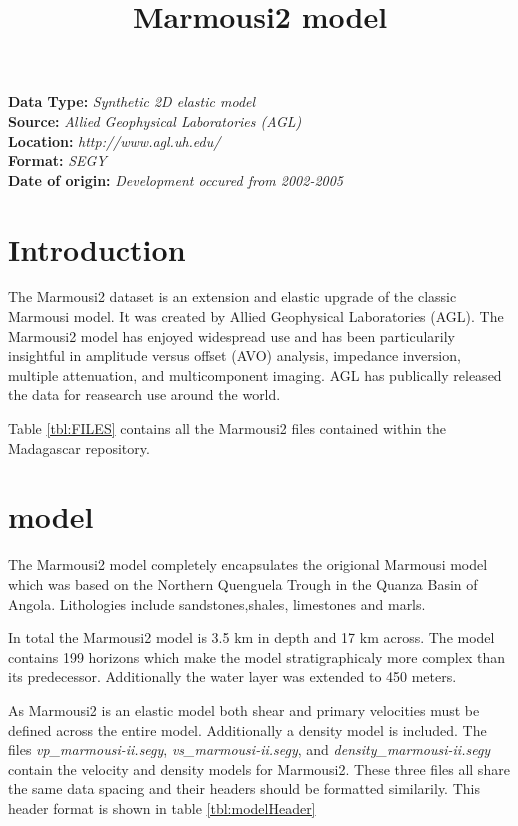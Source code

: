 \title{Marmousi2 model}
\author{}
\lstset{language=python,numbers=left,numberstyle=\tiny,showstringspaces=false}

\maketitle
\noindent
\textbf {Data Type:} \emph{Synthetic 2D elastic model}\\
\textbf {Source:} \emph{Allied Geophysical Laboratories (AGL)}\\
\textbf {Location:} \emph{http://www.agl.uh.edu/}\\
\textbf {Format:} \emph{SEGY} \\
\textbf{Date of origin:} \emph{Development occured from 2002-2005}\\

\section{Introduction}
The Marmousi2 dataset is an extension and elastic upgrade of the classic Marmousi model. It was created by Allied Geophysical 
Laboratories (AGL).  The Marmousi2 model has enjoyed widespread use and has been particularily insightful in amplitude versus
offset (AVO) analysis, impedance inversion, multiple attenuation, and multicomponent imaging.  AGL has publically released 
the data for reasearch use around the world.   

Table \ref{tbl:FILES} contains all the Marmousi2 files contained within the Madagascar repository.  

{
\tiny

\normalsize
}

\section{model}
The Marmousi2 model completely encapsulates the origional Marmousi model which was based on the Northern Quenguela Trough 
in the Quanza Basin of Angola.  Lithologies include sandstones,shales, limestones and marls.    

In total the Marmousi2 model is 3.5 km in depth and 17 km across.  The model contains 199 horizons which make the model 
stratigraphicaly more complex than its predecessor.  Additionally the water layer was extended to 450 meters.   

As Marmousi2 is an elastic model both shear and primary velocities must be defined across the entire model.  
Additionally a density model is included.  
The files \emph{vp\_marmousi-ii.segy}, \emph{vs\_marmousi-ii.segy}, and \emph{density\_marmousi-ii.segy} contain the velocity and 
density models for Marmousi2.  These three files all share the same data spacing and their headers should be formatted similarily.
This header format is shown in table \ref{tbl:modelHeader}

